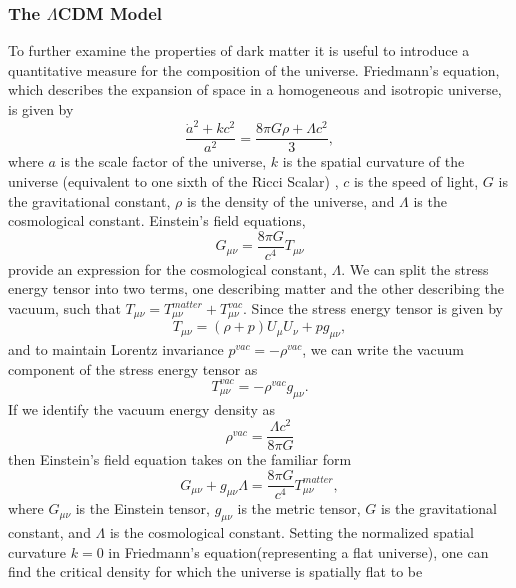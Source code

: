 \subsubsection{The $\Lambda$CDM Model}
To further examine the properties of dark matter it is useful to introduce a quantitative measure for the composition of the universe.  Friedmann's equation, which describes the expansion of space in a homogeneous and isotropic universe, is given by
\begin{equation}\label{Friedmann's}
\frac{\dot{a}^2 + kc^2}{a^2} = \frac{8 \pi G \rho + \Lambda c^2}{3},
\end{equation}
where $a$ is the scale factor of the universe, $k$ is the spatial curvature of the universe (equivalent to one sixth of the Ricci Scalar) , $c$ is the speed of light, $G$ is the gravitational constant, $\rho$ is the density of the universe, and $\Lambda$ is the cosmological constant. Einstein's field equations,
\begin{equation}\label{EFQ}
G_{\mu\nu} = \frac{8 \pi G}{c^4} T_{\mu\nu}
\end{equation}
provide an expression for the cosmological constant, $\Lambda$.  We can split the stress energy tensor into two terms, one describing matter and the other describing the vacuum, such that $T_{\mu\nu}=T_{\mu\nu}^{matter}+T_{\mu\nu}^{vac}$.  Since the stress energy tensor is given by
\begin{equation}\label{StressTensor}
T_{\mu\nu} = (\rho + p)U_{\mu}U_{\nu} + pg_{\mu\nu},
\end{equation}
and to maintain Lorentz invariance $p^{vac} = -\rho^{vac}$, we can write the vacuum component of the stress energy tensor as
\begin{equation}\label{StressTensorVac}
T_{\mu\nu}^{vac}=-\rho^{vac} g_{\mu\nu}.
\end{equation}
If we identify the vacuum energy density as
\begin{equation} \label{VacEnergyDens}
\rho^{vac}=\frac{\Lambda c^2}{8\pi G}
\end{equation}
then Einstein's field equation takes on the familiar form
\begin{equation}\label{EFQ2}
G_{\mu\nu} + g_{\mu\nu}\Lambda= \frac{8 \pi G}{c^4} T_{\mu\nu}^{matter},
\end{equation}
where $G_{\mu\nu}$ is the Einstein tensor, $g_{\mu\nu}$ is the metric tensor, $G$ is the gravitational constant, and $\Lambda$ is the cosmological constant.
Setting the normalized spatial curvature $k = 0$ in Friedmann's equation(representing a flat universe), one can find the critical density for which the universe is spatially flat to be
